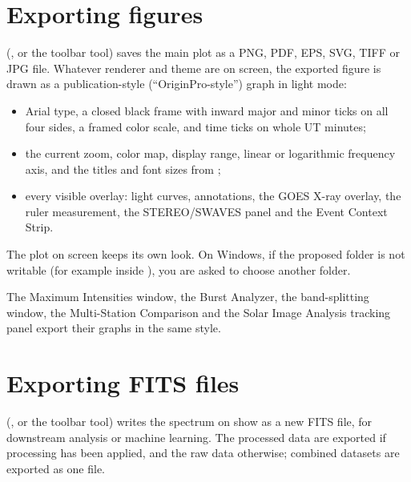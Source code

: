 \section{Exporting figures}
\label{sec:export-figure}

 (, or the  toolbar tool)
saves the main plot as a PNG, PDF, EPS, SVG, TIFF or JPG file. Whatever renderer and theme
are on screen, the exported figure is drawn as a publication-style (``OriginPro-style'')
graph in light mode:
\begin{itemize}
  \item Arial type, a closed black frame with inward major and minor ticks on all four
    sides, a framed color scale, and time ticks on whole UT minutes;
  \item the current zoom, color map, display range, linear or logarithmic frequency axis,
    and the titles and font sizes from ;
  \item every visible overlay: light curves, annotations, the GOES X-ray overlay, the ruler
    measurement, the STEREO/SWAVES panel and the Event Context Strip.
\end{itemize}
The plot on screen keeps its own look. On Windows, if the proposed folder is not writable
(for example inside ), you are asked to choose another folder.

The Maximum Intensities window, the Burst Analyzer, the band-splitting window, the
Multi-Station Comparison and the Solar Image Analysis tracking panel export their graphs in
the same style.

\section{Exporting FITS files}
\label{sec:export-fits}

 (, or the  toolbar
tool) writes the spectrum on show as a new FITS file, for downstream analysis or machine
learning. The processed data are exported if processing has been applied, and the raw data
otherwise; combined datasets are exported as one file.

